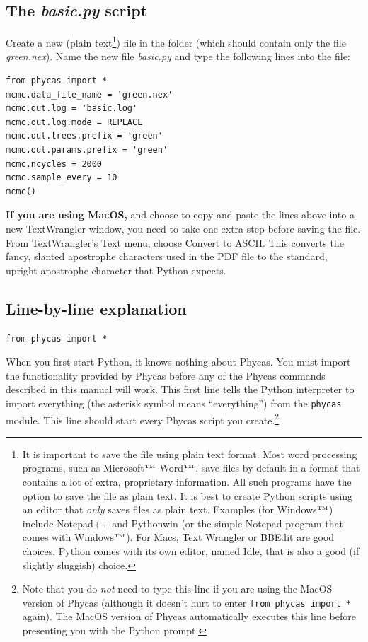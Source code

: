 \documentclass[10pt]{article}
\newcommand{\trademark}[1]{#1${}^{\mbox{\tiny TM}}$}
\newcommand{\pathname}[1]{{\em #1}}			%
\newcommand{\menu}[1]{{\sf #1}}				%
\newcommand{\code}[1]{{\tt #1}}				%
\begin{document}
\subsection{The {\em basic.py} script}
Create a new (plain text\footnote{It is important to save the file using plain text format. Most word processing programs, such as \trademark{Microsoft} \trademark{Word}, save files by default in a format that contains a lot of extra, proprietary information. All such programs have the option to save the file as plain text. It is best to create Python scripts using an editor that {\em only} saves files as plain text. Examples (for \trademark{Windows}) include Notepad++ and Pythonwin (or the simple Notepad program that comes with \trademark{Windows}). For Macs, Text Wrangler or BBEdit are good choices. Python comes with its own editor, named Idle, that is also a good (if slightly sluggish) choice.}) file in the folder (which should contain only the file \pathname{green.nex}). Name the new file \pathname{basic.py} and type the following lines into the file:
\begin{verbatim}
from phycas import *
mcmc.data_file_name = 'green.nex'
mcmc.out.log = 'basic.log'
mcmc.out.log.mode = REPLACE
mcmc.out.trees.prefix = 'green'
mcmc.out.params.prefix = 'green'
mcmc.ncycles = 2000
mcmc.sample_every = 10
mcmc()
\end{verbatim}
{\bf If you are using MacOS,} and choose to copy and paste the lines above into a new TextWrangler window, you need to take one extra step before saving the file. From TextWrangler's \menu{Text} menu, choose \menu{Convert to ASCII}. This converts the fancy, slanted apostrophe characters used in the PDF file to the standard, upright apostrophe character that Python expects.

\subsection{Line-by-line explanation} \label{subsec:basicpyexplanation}
\begin{samepage}
\begin{verbatim}
from phycas import *
\end{verbatim}
When you first start Python, it knows nothing about Phycas. You must import the functionality provided by Phycas before any of the Phycas commands described in this manual will work. This first line tells the Python interpreter to import everything (the asterisk symbol means ``everything'') from the \code{phycas} module. This line should start every Phycas script you create.\footnote{Note that you do {\em not} need to type this line if you are using the MacOS version of Phycas (although it doesn't hurt to enter \code{from phycas import *} again). The MacOS version of Phycas automatically executes this line before presenting you with the Python prompt.}
\end{samepage}
\end{document}
